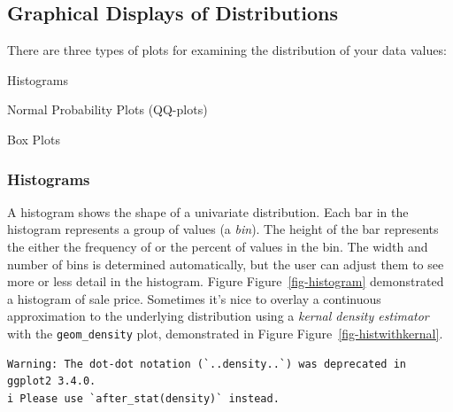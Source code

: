 \documentclass[
  letterpaper,
  DIV=11,
  numbers=noendperiod]{scrreprt}
\newenvironment{Shaded}{\begin{snugshade}}{\end{snugshade}}
\newcommand{\AttributeTok}[1]{\textcolor[rgb]{0.40,0.45,0.13}{#1}}
\newcommand{\DecValTok}[1]{\textcolor[rgb]{0.68,0.00,0.00}{#1}}
\newcommand{\FloatTok}[1]{\textcolor[rgb]{0.68,0.00,0.00}{#1}}
\newcommand{\FunctionTok}[1]{\textcolor[rgb]{0.28,0.35,0.67}{#1}}
\newcommand{\NormalTok}[1]{\textcolor[rgb]{0.00,0.23,0.31}{#1}}
\newcommand{\SpecialCharTok}[1]{\textcolor[rgb]{0.37,0.37,0.37}{#1}}
\newcommand{\StringTok}[1]{\textcolor[rgb]{0.13,0.47,0.30}{#1}}
\begin{document}
\hypertarget{graphdist}{%
\subsection{Graphical Displays of Distributions}\label{graphdist}}

There are three types of plots for examining the distribution of your
data values:

Histograms

Normal Probability Plots (QQ-plots)

Box Plots

\hypertarget{histograms}{%
\subsubsection*{Histograms}\label{histograms}}

A histogram shows the shape of a univariate distribution. Each bar in
the histogram represents a group of values (a \emph{bin}). The height of
the bar represents the either the frequency of or the percent of values
in the bin. The width and number of bins is determined automatically,
but the user can adjust them to see more or less detail in the
histogram. Figure Figure~\ref{fig-histogram} demonstrated a histogram of
sale price. Sometimes it's nice to overlay a continuous approximation to
the underlying distribution using a \emph{kernal density estimator} with
the \texttt{geom\_density} plot, demonstrated in Figure
Figure~\ref{fig-histwithkernal}.

\begin{Shaded}
\end{Shaded}

\begin{verbatim}
Warning: The dot-dot notation (`..density..`) was deprecated in ggplot2 3.4.0.
i Please use `after_stat(density)` instead.
\end{verbatim}
\end{document}
